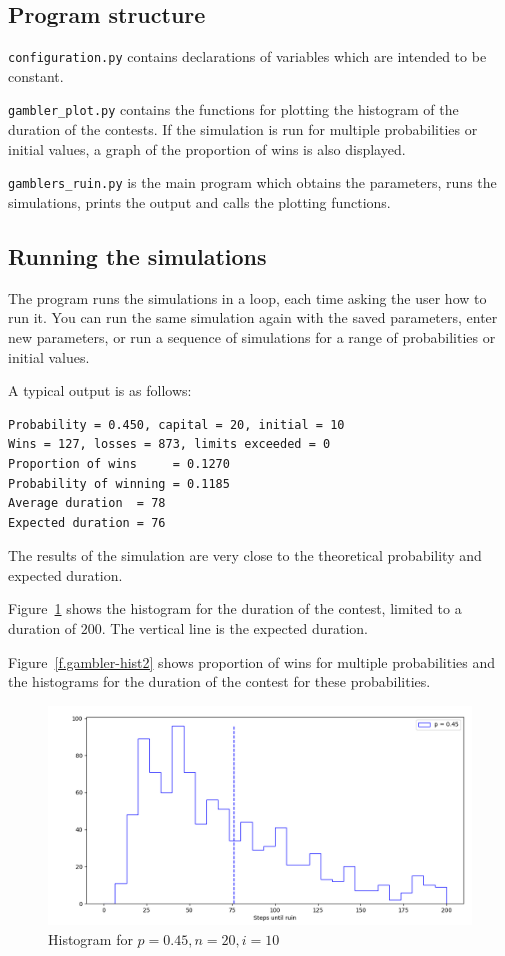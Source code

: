 \subsection{Program structure}

\verb+configuration.py+ contains declarations of variables which are intended to be constant.

\verb+gambler_plot.py+ contains the functions for plotting the histogram of the duration of the contests. If the simulation is run for multiple probabilities or initial values, a graph of the proportion of wins is also displayed.

\verb+gamblers_ruin.py+ is the main program which obtains the parameters, runs the simulations, prints the output and calls the plotting functions.

\subsection{Running the simulations}

The program runs the simulations in a loop, each time asking the user how to run it. You can run the same simulation again with the saved parameters, enter new parameters, or run a sequence of simulations for a range of probabilities or initial values.

A typical output is as follows:
\begin{verbatim}
Probability = 0.450, capital = 20, initial = 10
Wins = 127, losses = 873, limits exceeded = 0
Proportion of wins     = 0.1270
Probability of winning = 0.1185
Average duration  = 78
Expected duration = 76
\end{verbatim}
The results of the simulation are very close to the theoretical probability and expected duration.

Figure~\ref{f.gambler-hist1} shows the histogram for the duration of the contest, limited to a duration of $200$. The vertical line is the expected duration.

Figure~\ref{f.gambler-hist2} shows proportion of wins for multiple probabilities and the histograms for the duration of the contest for these probabilities.

\begin{figure}
\begin{center}
\includegraphics[width=\textwidth]{gamblers_ruin-01}
\end{center}
\caption{Histogram for $p=0.45, n=20, i=10$}\label{f.gambler-hist1}
\end{figure}

